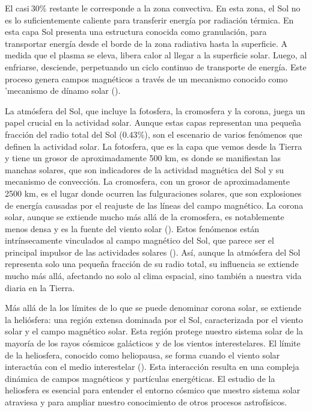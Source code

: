 El  casi$~30\%$ restante le corresponde a la zona convectiva. En esta zona, el Sol no es lo suficientemente caliente para transferir energía por radiación térmica. En esta capa Sol presenta una estructura conocida como granulación, para transportar energía desde el borde de la zona radiativa hasta la superficie. A medida que el plasma se eleva, libera calor al llegar a la superficie solar. Luego, al enfriarse, desciende, perpetuando un ciclo continuo de transporte de energía. Este proceso genera campos magnéticos a través de un mecanismo conocido como 'mecanismo de dínamo solar (\cite{Sturrock_1986}).

La atmósfera del Sol, que incluye la fotosfera, la cromosfera y la corona, juega un papel crucial en la actividad solar. Aunque estas capas representan una pequeña fracción del radio total del Sol ($0.43\%$), son el escenario de varios fenómenos que definen la actividad solar. La fotosfera, que es la capa que vemos desde la Tierra y tiene un grosor de aproximadamente 500 km, es donde se manifiestan las manchas solares, que son indicadores de la actividad magnética del Sol y su mecanismo de convección. La cromosfera, con un grosor de aproximadamente 2500 km, es el lugar donde ocurren las fulguraciones solares, que son explosiones de energía causadas por el reajuste de las líneas del campo magnético. La corona solar, aunque se extiende mucho más allá de la cromosfera, es notablemente menos densa y es la fuente del viento solar (\cite{Rozelot_2006}). Estos fenómenos están intrínsecamente vinculados al campo magnético del Sol, que parece ser el principal impulsor de las actividades solares (\cite{Sturrock_1986}). Así, aunque la atmósfera del Sol representa solo una pequeña fracción de su radio total, su influencia se extiende mucho más allá, afectando no solo al clima espacial, sino también a nuestra vida diaria en la Tierra.

Más allá de la los límites de lo que se puede denominar corona solar, se extiende la heliósfera: una región extensa dominada por el Sol, caracterizada por el viento solar y el campo magnético solar. Esta región protege nuestro sistema solar de la mayoría de los rayos cósmicos galácticos y de los vientos interestelares. El límite de la heliosfera, conocido como heliopausa, se forma cuando el viento solar interactúa con el medio interestelar (\cite{schrijver_2009}). Esta interacción resulta en una compleja dinámica de campos magnéticos y partículas energéticas. El estudio de la heliosfera es esencial para entender el entorno cósmico que nuestro sistema solar atraviesa y para ampliar nuestro conocimiento de otros procesos astrofísicos.

